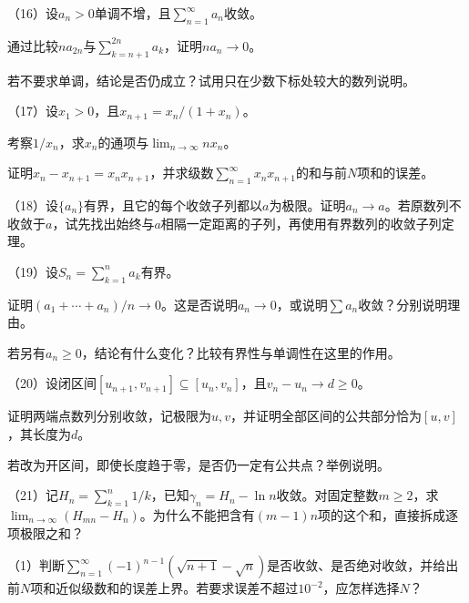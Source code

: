 \begin{exercise}
（16）设\(a_n>0\)单调不增，且\(\sum_{n=1}^{\infty}a_n\)收敛。

\quad {}通过比较\(na_{2n}\)与\(\sum_{k=n+1}^{2n}a_k\)，证明\(na_n\to0\)。

\quad {}若不要求单调，结论是否仍成立？试用只在少数下标处较大的数列说明。

（17）设\(x_1>0\)，且\(x_{n+1}=x_n/(1+x_n)\)。

\quad {}考察\(1/x_n\)，求\(x_n\)的通项与\(\lim_{n\to\infty}nx_n\)。

\quad {}证明\(x_n-x_{n+1}=x_nx_{n+1}\)，并求级数\(\sum_{n=1}^{\infty}x_nx_{n+1}\)的和与前\(N\)项和的误差。

（18）设\(\{a_n\}\)有界，且它的每个收敛子列都以\(a\)为极限。证明\(a_n\to a\)。若原数列不收敛于\(a\)，试先找出始终与\(a\)相隔一定距离的子列，再使用有界数列的收敛子列定理。

（19）设\(S_n=\sum_{k=1}^n a_k\)有界。

\quad {}证明\((a_1+\cdots+a_n)/n\to0\)。这是否说明\(a_n\to0\)，或说明\(\sum a_n\)收敛？分别说明理由。

\quad {}若另有\(a_n\ge0\)，结论有什么变化？比较有界性与单调性在这里的作用。

（20）设闭区间\([u_{n+1},v_{n+1}]\subseteq[u_n,v_n]\)，且\(v_n-u_n\to d\ge0\)。

\quad {}证明两端点数列分别收敛，记极限为\(u,v\)，并证明全部区间的公共部分恰为\([u,v]\)，其长度为\(d\)。

\quad {}若改为开区间，即使长度趋于零，是否仍一定有公共点？举例说明。

（21）记\(H_n=\sum_{k=1}^n1/k\)，已知\(\gamma_n=H_n-\ln n\)收敛。对固定整数\(m\ge2\)，求\(\lim_{n\to\infty}(H_{mn}-H_n)\)。为什么不能把含有\((m-1)n\)项的这个和，直接拆成逐项极限之和？
\end{exercise}

\begin{exercise}[选做]
\label{exs:analysis-comprehensive-optional}
\mbox{}\par\nobreak

（1）判断\(\sum_{n=1}^{\infty}(-1)^{n-1}(\sqrt{n+1}-\sqrt n)\)是否收敛、是否绝对收敛，并给出前\(N\)项和近似级数和的误差上界。若要求误差不超过\(10^{-2}\)，应怎样选择\(N\)？
\end{exercise}
